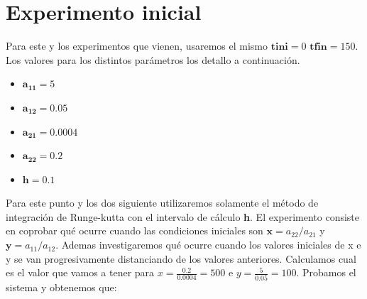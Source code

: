 \documentclass[12pt,a4paper]{article}
\begin{document}
\section{Experimento inicial} 
Para este y los experimentos que vienen, usaremos el mismo $\pmb{tini} = 0$ $\pmb{tfin} = 150$. Los valores para los distintos parámetros los detallo a continuación. 
\begin{itemize}
	\item $\pmb{a_{11}} = 5$ 
	\item $\pmb{a_{12}} = 0.05$  
	\item $\pmb{a_{21}} = 0.0004$
	\item $\pmb{a_{22}} = 0.2$ 
	\item $\pmb{h} = 0.1$ 
\end{itemize}
Para este punto y los dos siguiente utilizaremos solamente el método de integración de Runge-kutta con el intervalo de cálculo \textbf{h}. El experimento consiste en coprobar qué ocurre cuando las condiciones iniciales son $\pmb{x} = a_{22}/a_{21}$ y  $\pmb{y} = a_{11}/a_{12}$. Ademas investigaremos qué ocurre cuando los valores iniciales de x e y se van progresivamente distanciando de los valores anteriores. Calculamos cual es el valor que vamos a tener para $x=\frac{0.2}{0.0004}=500$ e $y=\frac{5}{0.05}=100$. Probamos el sistema y obtenemos que:
\end{document}
